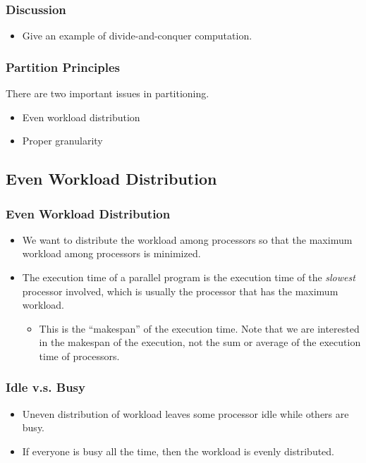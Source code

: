 \documentclass{beamer}
\begin{document}
\begin{CJK}{UTF8}{bsmi}
\begin{frame}
\frametitle{Discussion}
\begin{itemize}
\item Give an example of divide-and-conquer computation.
\end{itemize}
\end{frame}

\begin{frame}
\frametitle{Partition Principles}
There are two important issues in partitioning.
\begin{itemize}
\item Even workload distribution
\item Proper granularity
\end{itemize}
\end{frame}

\subsection{Even Workload Distribution}

\begin{frame}
\frametitle{Even Workload Distribution}
\begin{itemize}
\item We want to distribute the workload among processors so that the
  maximum workload among processors is minimized.
\item The execution time of a parallel program is the execution time
  of the {\em slowest} processor involved, which is usually the
  processor that has the maximum workload.
\begin{itemize}
\item This is the ``makespan'' of the execution time.  Note that we
  are interested in the makespan of the execution, not the sum or
  average of the execution time of processors.
\end{itemize}
\end{itemize}
\end{frame}

\begin{frame}
\frametitle{Idle v.s. Busy}
\begin{itemize}
\item Uneven distribution of workload leaves some processor idle while
  others are busy.
\item If everyone is busy all the time, then the workload is evenly
  distributed.
\end{itemize}
\end{frame}


\end{CJK}
\end{document}
